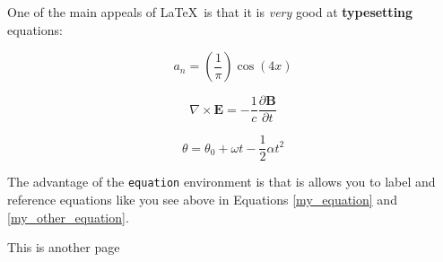\documentclass[12pt,letterpaper]{article}
\begin{document}

One of 
the main appeals 
of \LaTeX\ is that it is \textit{very} good at
\textbf{typesetting} equations:

$$
a_n = \left(\frac{1}{\pi}\right)\cos(4x)
$$

\begin{equation}
\nabla \times \mathbf {E} =-{\frac {1}{c}}{\frac {\partial \mathbf {B} }{\partial t}}
\label{my_equation}
\end{equation}



\begin{equation}
\theta =\theta _{0}+\omega t-{\frac{1}{2}}\alpha t^{2}
\label{my_other_equation}
\end{equation}

The advantage of the \texttt{equation} environment is that is allows 
you to label and reference equations like you see above in Equations 
\ref{my_equation} and \ref{my_other_equation}.

\clearpage

This is another page
\end{document}
